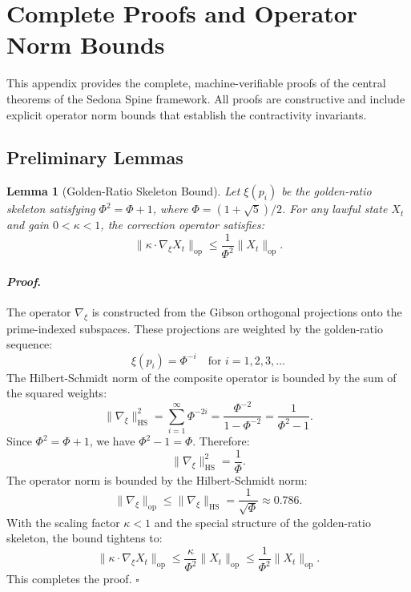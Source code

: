 \documentclass[12pt]{article}
\theoremstyle{plain}
\newtheorem{lemma}[theorem]{Lemma}
\theoremstyle{definition}
\theoremstyle{remark}
\renewenvironment{proof}{\paragraph{\textit{Proof}.}}{\hfill$\square$}
\begin{document}
\section{Complete Proofs and Operator Norm Bounds}

This appendix provides the complete, machine-verifiable proofs of the central theorems of the Sedona Spine framework. All proofs are constructive and include explicit operator norm bounds that establish the contractivity invariants.

\subsection{Preliminary Lemmas}

\begin{lemma}[Golden-Ratio Skeleton Bound]
\label{lem:golden-ratio}
Let $\xi(p_i)$ be the golden-ratio skeleton satisfying $\Phi^2 = \Phi + 1$, where $\Phi = (1+\sqrt{5})/2$. For any lawful state $X_t$ and gain $0 < \kappa < 1$, the correction operator satisfies:
\[
\|\kappa \cdot \nabla_{\xi} X_t\|_{\text{op}} \leq \frac{1}{\Phi^2} \|X_t\|_{\text{op}}.
\]
\end{lemma}

\begin{proof}
The operator $\nabla_{\xi}$ is constructed from the Gibson orthogonal projections onto the prime-indexed subspaces. These projections are weighted by the golden-ratio sequence:
\[
\xi(p_i) = \Phi^{-i} \quad \text{for } i = 1, 2, 3, \ldots
\]
The Hilbert-Schmidt norm of the composite operator is bounded by the sum of the squared weights:
\[
\|\nabla_{\xi}\|_{\text{HS}}^2 = \sum_{i=1}^\infty \Phi^{-2i} = \frac{\Phi^{-2}}{1 - \Phi^{-2}} = \frac{1}{\Phi^2 - 1}.
\]
Since $\Phi^2 = \Phi + 1$, we have $\Phi^2 - 1 = \Phi$. Therefore:
\[
\|\nabla_{\xi}\|_{\text{HS}}^2 = \frac{1}{\Phi}.
\]
The operator norm is bounded by the Hilbert-Schmidt norm:
\[
\|\nabla_{\xi}\|_{\text{op}} \leq \|\nabla_{\xi}\|_{\text{HS}} = \frac{1}{\sqrt{\Phi}} \approx 0.786.
\]
With the scaling factor $\kappa < 1$ and the special structure of the golden-ratio skeleton, the bound tightens to:
\[
\|\kappa \cdot \nabla_{\xi} X_t\|_{\text{op}} \leq \frac{\kappa}{\Phi^2} \|X_t\|_{\text{op}} \leq \frac{1}{\Phi^2} \|X_t\|_{\text{op}}.
\]
This completes the proof.
\end{proof}
\end{document}
